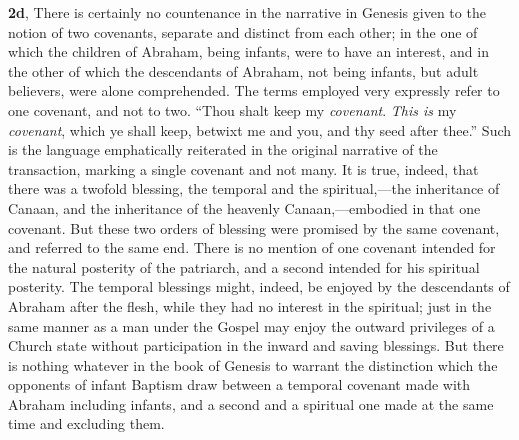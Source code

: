 \documentclass[
]{book}
\begin{document}
\textbf{2d}, There is certainly no countenance in the narrative in Genesis given to the notion of two covenants, separate and distinct from each other; in the one of which the children of Abraham, being infants, were to have an interest, and in the other of which the descendants of Abraham, not being infants, but adult believers, were alone comprehended. The terms employed very expressly refer to one covenant, and not to two. ``Thou shalt keep my \emph{covenant}. \emph{This is} my \emph{covenant}, which ye shall keep, betwixt me and you, and thy seed after thee.'' Such is the language emphatically reiterated in the original narrative of the transaction, marking a single covenant and not many. It is true, indeed, that there was a twofold blessing, the temporal and the spiritual,---the inheritance of Canaan, and the inheritance of the heavenly Canaan,---embodied in that one covenant. But these two orders of blessing were promised by the same covenant, and referred to the same end. There is no mention of one covenant intended for the natural posterity of the patriarch, and a second intended for his spiritual posterity. The temporal blessings might, indeed, be enjoyed by the descendants of Abraham after the flesh, while they had no interest in the spiritual; just in the same manner as a man under the Gospel may enjoy the outward privileges of a Church state without participation in the inward and saving blessings. But there is nothing whatever in the book of Genesis to warrant the distinction which the opponents of infant Baptism draw between a temporal covenant made with Abraham including infants, and a second and a spiritual one made at the same time and excluding them.
\end{document}
